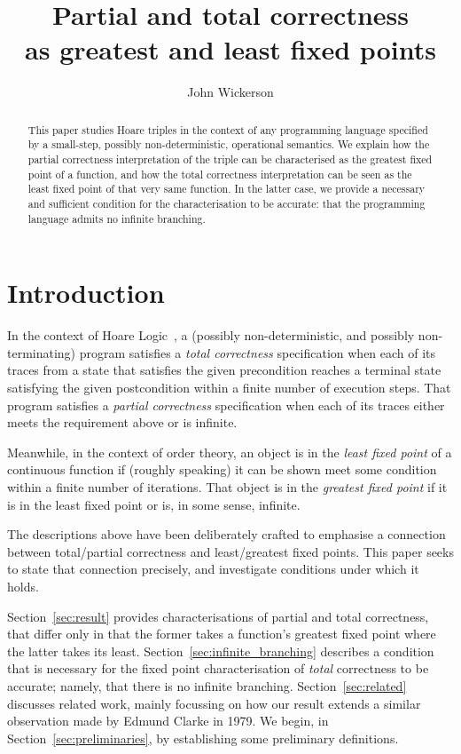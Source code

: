 \documentclass{llncs}
\title{Partial and total correctness \\ as greatest and least fixed points}
\author{John Wickerson}
\institute{Imperial College London}
\begin{document}
\maketitle

\thispagestyle{plain}
\pagestyle{plain}

\begin{abstract}
This paper studies Hoare triples in the context of any programming
language specified by a small-step, possibly non-deterministic,
operational semantics. We explain how the partial correctness
interpretation of the triple can be characterised as the greatest
fixed point of a function, and how the total correctness
interpretation can be seen as the least fixed point of that very same
function. In the latter case, we provide a necessary and sufficient
condition for the characterisation to be accurate: that the
programming language admits no infinite branching.
\end{abstract}

\section{Introduction}

In the context of Hoare Logic~\cite{hoare69}, a (possibly
non-deterministic, and possibly non-terminating) program satisfies a
\emph{total correctness} specification when each of its traces from a
state that satisfies the given precondition reaches a terminal state
satisfying the given postcondition within a finite number of execution
steps. That program satisfies a \emph{partial correctness}
specification when each of its traces either meets the requirement
above or is infinite. 

Meanwhile, in the context of order theory, an
object is in the \emph{least fixed point} of a continuous function if
(roughly speaking) it can be shown meet some condition within a finite
number of iterations. That object is in the \emph{greatest fixed
point} if it is in the least fixed point or is, in some sense,
infinite.

The descriptions above have been deliberately crafted to emphasise a
connection between total/partial correctness and least/greatest fixed
points. This paper seeks to state that connection precisely, and
investigate conditions under which it holds.

Section~\ref{sec:result} provides characterisations of partial and
total correctness, that differ only in that the former takes a
function's greatest fixed point where the latter takes its least.
Section~\ref{sec:infinite_branching} describes a condition that is
necessary for the fixed point characterisation of \emph{total}
correctness to be accurate; namely, that there is no infinite
branching. Section~\ref{sec:related} discusses related work, mainly
focussing on how our result extends a similar observation made by
Edmund Clarke in 1979. We begin, in Section~\ref{sec:preliminaries},
by establishing some preliminary definitions.
\end{document}
